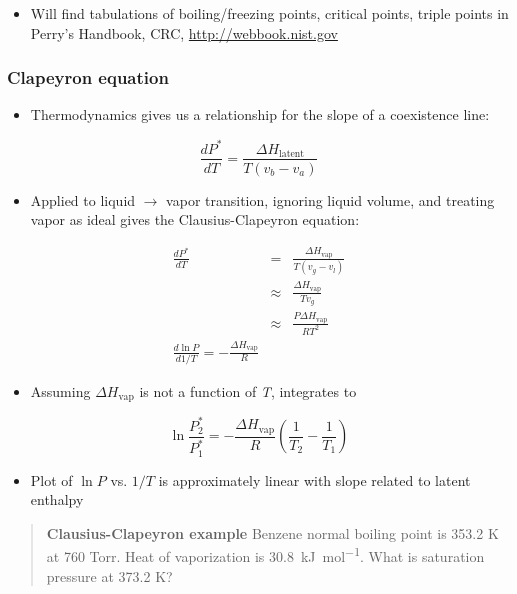 \documentclass[11pt]{article}
\begin{document}
\begin{itemize}
\item Will find tabulations of boiling/freezing points, critical points, triple points in Perry's Handbook, CRC, \url{http://webbook.nist.gov}
\end{itemize}

\subsubsection{Clapeyron equation}
\label{sec-8-1-1}
\begin{itemize}
\item Thermodynamics gives us a relationship for the slope of a coexistence line:
\end{itemize}
\[ \frac{d P^{*}}{dT} = \frac{\Delta H_{\text{latent}}}{T(v_{b}-v_{a})} \]

\begin{itemize}
\item Applied to liquid $\to$ vapor transition, ignoring liquid volume, and treating vapor as ideal gives the Clausius-Clapeyron equation:
\end{itemize}

\begin{eqnarray*}
\frac{d P^{*}}{dT} & = & \frac{\Delta H_{\text{vap}}}{T(v_{g}-v_{l})} \\
           & \approx & \frac{\Delta H_{\text{vap}}}{T v_{g}} \\
          & \approx & \frac{P \Delta H_{\text{vap}}}{R T^{2}} \\
\frac{d \ln P}{d 1/T} = - \frac{\Delta H_{\text{vap}}}{R}
\end{eqnarray*}

\begin{itemize}
\item Assuming \(\Delta H_{\text{vap}}\) is not a function of \emph{T}, integrates to
\end{itemize}

\[ \ln \frac{P^{*}_{2}}{P^{*}_{1}} = -\frac{\Delta H_{\text{vap}}}{R}\left ( \frac{1}{T_{2}} - \frac{1}{T_{1}} \right ) \]

\begin{itemize}
\item Plot of \(\ln P\) vs. \(1/T\) is approximately linear with slope related to latent enthalpy
\end{itemize}

\begin{quote}
\textbf{Clausius-Clapeyron example} Benzene normal boiling point is 353.2 K at 760 Torr.  Heat of vaporization is \SI{30.8}{\kilo\joule\per\mole}.  What is saturation pressure at 373.2 K?
\end{quote}
\end{document}
